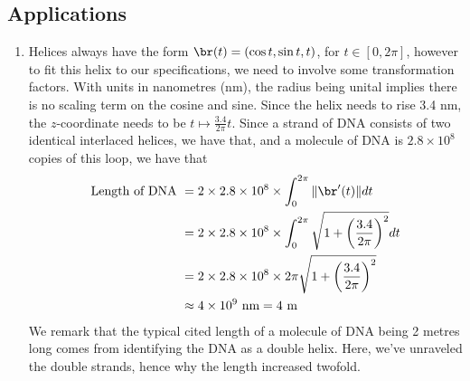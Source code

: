\subsection*{Applications}
\begin{enumerate}[resume]
    \item {}
    {%

    }
    {Helices always have the form $\br(t) = (\cos t, \sin t, t)$, for $t\in [0,2\pi]$, however to fit this helix to our specifications, we need to involve some transformation factors. With units in nanometres (nm), the radius being unital implies there is no scaling term on the cosine and sine. Since the helix needs to rise 3.4 nm, the $z$-coordinate needs to be $t\mapsto \frac{3.4}{2\pi}t$. Since a strand of DNA consists of two identical interlaced helices, we have that, and a molecule of DNA is $2.8 \times 10^8$ copies of this loop, we have that 
\begin{align*}
\textrm{Length of DNA } &= 2\times 2.8\times 10^8 \times \int_0^{2\pi}\|\br'(t)\|dt \\
&= 2\times 2.8\times 10^8 \times \int_0^{2\pi}\sqrt{1+\left(\frac{3.4}{2\pi}\right)^2}dt \\ 
&=2 \times 2.8\times 10^8 \times 2\pi\sqrt{1+\left(\frac{3.4}{2\pi}\right)^2}\\
&\approx 4\times 10^9 \textrm{ nm} = 4 \textrm{ m}
\end{align*}
We remark that the typical cited length of a molecule of DNA being 2 metres long comes from identifying the DNA as a double helix. Here, we've unraveled the double strands, hence why the length increased twofold. 
    } 
\end{enumerate}
